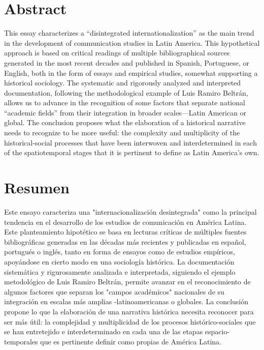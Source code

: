 \documentclass{tufte-handout}
\begin{document}
\begin{titlepage}
\begin{fullwidth}
\end{fullwidth}

\vspace*{5em}


\hypertarget{abstract}{%
\section{Abstract}\label{abstract}}

This essay characterizes a ``disintegrated internationalization'' as the
main trend in the development of communication studies in Latin America.
This hypothetical approach is based on critical readings of multiple
bibliographical sources generated in the most recent decades and
published in Spanish, Portuguese, or English, both in the form of essays
and empirical studies, somewhat supporting a historical sociology. The
systematic and rigorously analyzed and interpreted documentation,
following the methodological example of Luis Ramiro Beltrán, allows us
to advance in the recognition of some factors that separate national
``academic fields'' from their integration in broader scales---Latin
American or global. The conclusion proposes what the elaboration of a
historical narrative needs to recognize to be more useful: the
complexity and multiplicity of the historical-social processes that have
been interwoven and interdetermined in each of the spatiotemporal stages
that it is pertinent to define as Latin America's own.


\hypertarget{abstract}{%
\section{Resumen}\label{resumen}}

Este ensayo caracteriza una "internacionalización desintegrada" como la principal tendencia en el desarrollo de los estudios de comunicación en América Latina. Este planteamiento hipotético se basa en lecturas críticas de múltiples fuentes bibliográficas generadas en las décadas más recientes y publicadas en español, portugués o inglés, tanto en forma de ensayos como de estudios empíricos, apoyándose en cierto modo en una sociología histórica. La documentación sistemática y rigurosamente analizada e interpretada, siguiendo el ejemplo metodológico de Luis Ramiro Beltrán, permite avanzar en el reconocimiento de algunos factores que separan los "campos académicos" nacionales de su integración en escalas más amplias -latinoamericanas o globales. La conclusión propone lo que la elaboración de una narrativa histórica necesita reconocer para ser más útil: la complejidad y multiplicidad de los procesos histórico-sociales que se han entretejido e interdeterminado en cada una de las etapas espacio-temporales que es pertinente definir como propias de América Latina.


 




 \end{titlepage}
\end{document}
